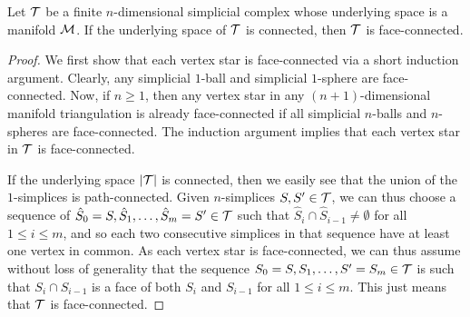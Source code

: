 \documentclass[10pt,a4paper]{article}
\begin{document}
\begin{lemma}\label{lemma:connectivity}
    Let ${\mathcal T}$ be a finite $n$-dimensional simplicial complex whose underlying space is a manifold ${\mathcal M}$.
    If the underlying space of ${\mathcal T}$ is connected, then ${\mathcal T}$ is face-connected.
\end{lemma}
\begin{proof}
    We first show that each vertex star is face-connected via a short induction argument.
    Clearly, any simplicial $1$-ball and simplicial $1$-sphere are face-connected. 
    Now, if $n \geq 1$, then any vertex star in any $(n+1)$-dimensional manifold triangulation is already face-connected if all simplicial $n$-balls and $n$-spheres are face-connected.
    The induction argument implies that each vertex star in ${\mathcal T}$ is face-connected.

    If the underlying space $\left| {\mathcal T} \right|$ is connected, 
    then we easily see that the union of the $1$-simplices is path-connected.
    Given $n$-simplices $S,S' \in {\mathcal T}$, 
    we can thus choose a sequence of $\hat S_0=S,\hat S_1,\dots,\hat S_m=S' \in {\mathcal T}$ such that $\hat S_{i} \cap \hat S_{i-1} \neq \emptyset$ for all $1 \leq i \leq m$, and so each two consecutive simplices in that sequence have at least one vertex in common. 
    As each vertex star is face-connected, 
    we can thus assume without loss of generality that the sequence $S_0=S,S_1,\dots,S'=S_m \in {\mathcal T}$ 
    is such that $S_{i} \cap S_{i-1}$ is a face of both $S_{i}$ and $S_{i-1}$ for all $1 \leq i \leq m$.
    This just means that ${\mathcal T}$ is face-connected. 
\end{proof}
\end{document}
